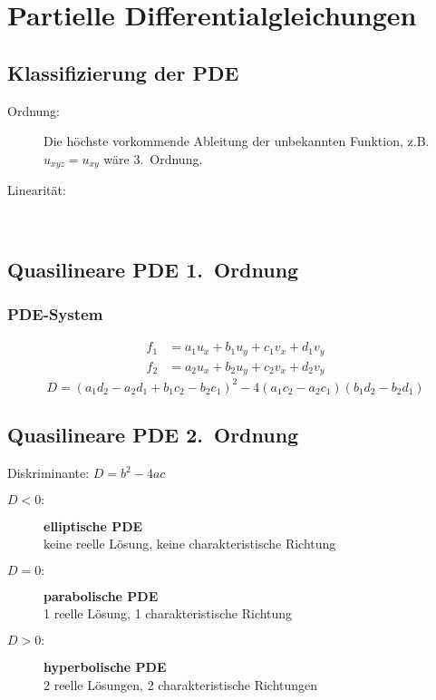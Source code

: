 
\section{Partielle Differentialgleichungen} %
	\subsection{Klassifizierung der PDE} %
		\begin{description}
			\item[Ordnung:] Die höchste vorkommende Ableitung der unbekannten
			Funktion, z.B.~$u_{xyz} = u_{xy}$ wäre 3.~Ordnung.
			\item[Linearität:]
			~
		\end{description}
	\subsection{Quasilineare PDE 1.~Ordnung} %
		\subsubsection{PDE-System} %
			\begin{align*}
				f_1 &= a_1 u_x + b_1 u_y + c_1 v_x + d_1 v_y \\
				f_2 &= a_2 u_x + b_2 u_y + c_2 v_x + d_2 v_y
			\end{align*}
			\[
				D = (a_1 d_2 - a_2 d_1 + b_1 c_2 - b_2 c_1)^2 -
				4(a_1 c_2 - a_2 c_1)(b_1 d_2 - b_2 d_1)
			\]
	\subsection{Quasilineare PDE 2.~Ordnung} %
		Diskriminante: $\displaystyle D=b^2-4ac$
		\begin{description}
			\item[$D < 0\!:$] \textbf{elliptische PDE} \\
			keine reelle Lösung, keine charakteristische Richtung
			\item[$D = 0\!:$] \textbf{parabolische PDE} \\
			1 reelle Lösung, 1 charakteristische Richtung
			\item[$D > 0\!:$] \textbf{hyperbolische PDE} \\
			2 reelle Lösungen, 2 charakteristische Richtungen
		\end{description}
